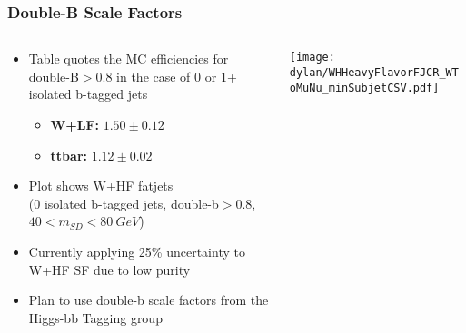 \documentclass{beamer}
\begin{document}
\begin{frame}
  \frametitle{Double-B Scale Factors}
  \begin{columns}
    \begin{column}{0.5\linewidth}
      \begin{itemize}
      \item Table quotes the MC efficiencies for
        double-B$> 0.8$ in the case of 0 or 1+ isolated b-tagged jets
        \begin{itemize}
        \item {\bf W+LF:} $1.50 \pm 0.12$
        \item {\bf ttbar:} $1.12 \pm 0.02$
        \end{itemize}
      \item Plot shows W+HF fatjets \\
        (0 isolated b-tagged jets, double-b$> 0.8$, $40 < m_{SD} < \SI{80}{GeV}$)
      \item Currently applying 25\% uncertainty to W+HF SF due to low purity
      \item Plan to use double-b scale factors from the Higgs-bb Tagging group
      \end{itemize}
    \end{column}
    \begin{column}{0.7\linewidth}
      {\footnotesize
        
      }
      \texttt{[image: dylan/WHHeavyFlavorFJCR\_WToMuNu\_minSubjetCSV.pdf]}
    \end{column}
  \end{columns}
\end{frame}
\end{document}
